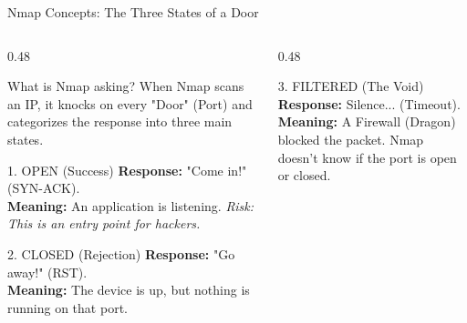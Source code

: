 \documentclass[aspectratio=169]{beamer}  %
\begin{document}
\begin{frame}{Nmap Concepts: The Three States of a Door}
    \begin{columns}[T]
        \begin{column}{0.48\textwidth}
            \begin{block}{What is Nmap asking?}
                \footnotesize
                When Nmap scans an IP, it knocks on every "Door" (Port) and categorizes the response into three main states.
            \end{block}
            \begin{exampleblock}{1. OPEN (Success)}
                \footnotesize
                \textbf{Response:} "Come in!" (SYN-ACK).\\
                \textbf{Meaning:} An application is listening.
                \textit{Risk: This is an entry point for hackers.}
            \end{exampleblock}
            \begin{alertblock}{2. CLOSED (Rejection)}
                \footnotesize
                \textbf{Response:} "Go away!" (RST).\\
                \textbf{Meaning:} The device is up, but nothing is running on that port.
            \end{alertblock}
        \end{column}
        \begin{column}{0.48\textwidth}
            \begin{block}{3. FILTERED (The Void)}
                \footnotesize
                \textbf{Response:} Silence... (Timeout).\\
                \textbf{Meaning:} A Firewall (Dragon) blocked the packet. Nmap doesn't know if the port is open or closed.
            \end{block}
            \begin{center}
\end{center}
\end{column}
\end{columns}
\end{frame}
\end{document}
